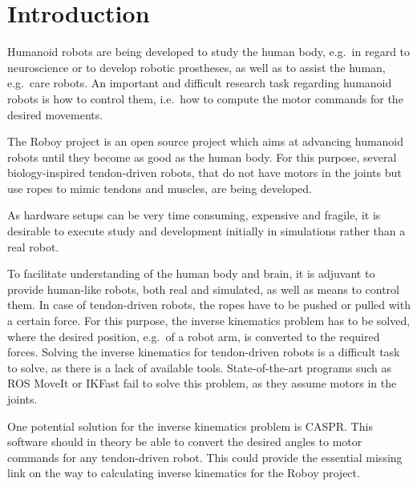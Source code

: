 \chapter{Introduction}\label{chapter:introduction}

Humanoid robots are being developed to study the human body, e.g.\ in regard to neuroscience or to develop robotic prostheses, as well as to assist the human, e.g.\ care robots. An  important and difficult research task regarding humanoid robots is how to control them, i.e.\ how to compute the motor commands for the desired movements. 

The Roboy project is an open source project which aims at advancing humanoid robots until they become as good as the human body\cite{Roboy}. For this purpose, several biology-inspired tendon-driven robots, that do not have motors in the joints but use ropes to mimic tendons and muscles, are being developed.%

As hardware setups can be very time consuming, expensive and fragile, it is desirable to execute study and development initially in simulations rather than a real robot.%

To facilitate understanding of the human body and brain, it is adjuvant to provide human-like robots, both real and simulated, as well as means to control them. In case of tendon-driven robots, the ropes have to be pushed or pulled with a certain force. For this purpose, the inverse kinematics problem has to be solved, where the desired position, e.g.\ of a robot arm, is converted to the required forces. Solving the inverse kinematics for tendon-driven robots is a difficult task to solve, as there is a lack of available tools. State-of-the-art programs such as ROS MoveIt\cite{moveit} or IKFast\cite{openrave} fail to solve this problem, as they assume motors in the joints.

One potential solution for the inverse kinematics problem is CASPR. This software should in theory be able to convert the desired angles to motor commands for any tendon-driven robot\cite{CASPR}. This could provide the essential missing link on the way to calculating inverse kinematics for the Roboy project. 

